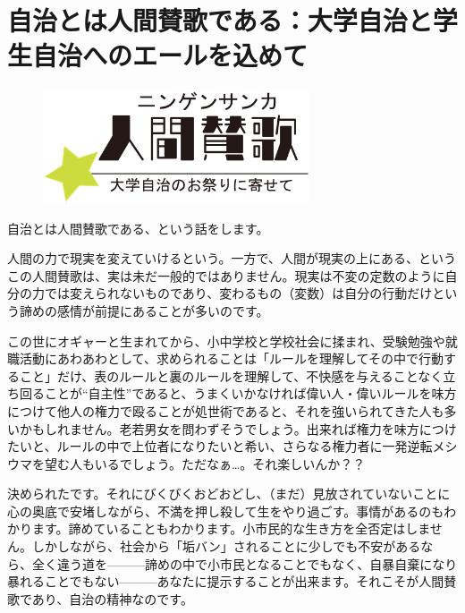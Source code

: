\section{自治とは人間賛歌である：大学自治と学生自治へのエールを込めて}\label{sec:ningensanka}

\begin{figure}[htbp]
  \begin{center}
    \includegraphics[width=0.7\textwidth]{gazo/ningensanka.png}
  \end{center}
\end{figure}

自治とは人間賛歌である、という話をします。

人間の力で現実を変えていけるという。一方で、人間が現実の上にある、というこの人間賛歌は、実は未だ一般的ではありません。現実は不変の定数のように自分の力では変えられないものであり、変わるもの（変数）は自分の行動だけという諦めの感情が前提にあることが多いのです。

この世にオギャーと生まれてから、小中学校と学校社会に揉まれ、受験勉強や就職活動にあわあわとして、求められることは「ルールを理解してその中で行動すること」だけ、表のルールと裏のルールを理解して、不快感を与えることなく立ち回ることが“自主性”であると、うまくいかなければ偉い人・偉いルールを味方につけて他人の権力で殴ることが処世術であると、それを強いられてきた人も多いかもしれません。老若男女を問わずそうでしょう。出来れば権力を味方につけたいと、ルールの中で上位者になりたいと希い、さらなる権力者に一発逆転メシウマを望む人もいるでしょう。ただなぁ…。それ楽しいんか？？

決められたです。それにびくびくおどおどし、（まだ）見放されていないことに心の奥底で安堵しながら、不満を押し殺して生をやり過ごす。事情があるのもわかります。諦めていることもわかります。小市民的な生き方を全否定はしません。しかしながら、社会から「垢バン」されることに少しでも不安があるなら、全く違う道を---------諦めの中で小市民となることでもなく、自暴自棄になり暴れることでもない---------あなたに提示することが出来ます。それこそが人間賛歌であり、自治の精神なのです。

